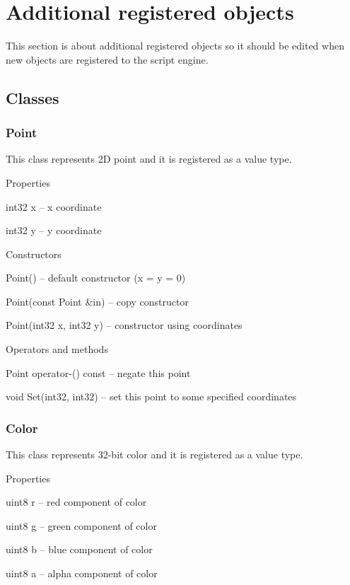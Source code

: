 \section{Additional registered objects}

This section is about additional registered objects so it should be edited when new objects are registered to the script engine.

\subsection{Classes}

\subsubsection{Point}

This class represents 2D point and it is registered as a value type.

\begin{titled-itemize}{Properties}
  \item int32 x -- x coordinate
  \item int32 y -- y coordinate
\end{titled-itemize}

\begin{titled-itemize}{Constructors}
  \item Point() -- default constructor (x = y = 0)
  \item Point(const Point \&in) -- copy constructor
  \item Point(int32 x, int32 y)  -- constructor using coordinates
\end{titled-itemize}

\begin{titled-itemize}{Operators and methods}
  \item Point operator-() const -- negate this point
  \item void Set(int32, int32) -- set this point to some specified coordinates
\end{titled-itemize}

\subsubsection{Color}

This class represents 32-bit color and it is registered as a value type.

\begin{titled-itemize}{Properties}
  \item uint8 r -- red component of color
  \item uint8 g -- green component of color
  \item uint8 b -- blue component of color
  \item uint8 a -- alpha component of color
\end{titled-itemize}

